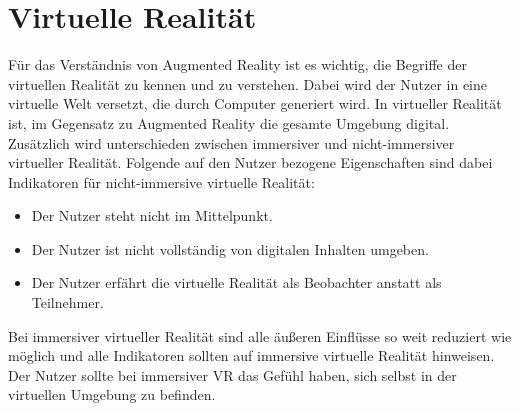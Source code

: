   \section{Virtuelle Realität}
  Für das Verständnis von Augmented Reality ist es wichtig, die Begriffe der virtuellen Realität zu kennen und zu verstehen.
  Dabei wird der Nutzer in eine virtuelle Welt versetzt, die durch Computer generiert wird.
  In virtueller Realität ist, im Gegensatz zu Augmented Reality die gesamte Umgebung digital.
  \autocite[vgl.][S.15]{Dalton2023}
  Zusätzlich wird unterschieden zwischen immersiver und nicht-immersiver virtueller Realität.
  Folgende auf den Nutzer bezogene Eigenschaften sind dabei Indikatoren für nicht-immersive virtuelle Realität:
  \begin{itemize}
    \item Der Nutzer steht nicht im Mittelpunkt.
    \item Der Nutzer ist nicht vollständig von digitalen Inhalten umgeben.
    \item Der Nutzer erfährt die virtuelle Realität als Beobachter anstatt als Teilnehmer.
  \end{itemize}
  Bei immersiver virtueller Realität sind alle äußeren Einflüsse so weit reduziert wie möglich und alle Indikatoren sollten auf immersive virtuelle Realität hinweisen.
  Der Nutzer sollte bei immersiver VR das Gefühl haben, sich selbst in der virtuellen Umgebung zu befinden.
  \autocite[vgl.][S.23-24]{Wolfel2023}

